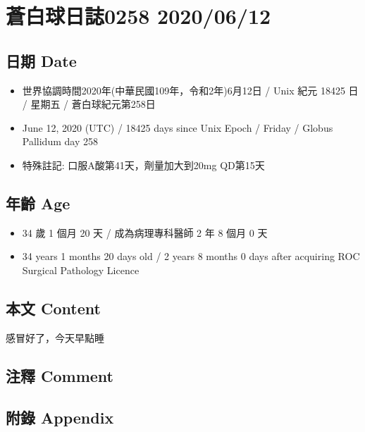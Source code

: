 \documentclass[a5paper, 11pt
]{book}
\providecommand{\tightlist}{%
  \setlength{\itemsep}{0pt}\setlength{\parskip}{0pt}}
\begin{document}
\hypertarget{ux84bcux767dux7403ux65e5ux8a8c0258-20200612}{%
\section{蒼白球日誌0258
2020/06/12}\label{ux84bcux767dux7403ux65e5ux8a8c0258-20200612}}

\hypertarget{ux65e5ux671f-date-11}{%
\subsection{日期 Date}\label{ux65e5ux671f-date-11}}

\begin{itemize}
\tightlist
\item
  世界協調時間2020年(中華民國109年，令和2年)6月12日 / Unix 紀元 18425 日
  / 星期五 / 蒼白球紀元第258日
\item
  June 12, 2020 (UTC) / 18425 days since Unix Epoch / Friday / Globus
  Pallidum day 258
\item
  特殊註記: 口服A酸第41天，劑量加大到20mg QD第15天
\end{itemize}

\hypertarget{ux5e74ux9f61-age-11}{%
\subsection{年齡 Age}\label{ux5e74ux9f61-age-11}}

\begin{itemize}
\tightlist
\item
  34 歲 1 個月 20 天 / 成為病理專科醫師 2 年 8 個月 0 天
\item
  34 years 1 months 20 days old / 2 years 8 months 0 days after
  acquiring ROC Surgical Pathology Licence
\end{itemize}

\hypertarget{ux672cux6587-content-11}{%
\subsection{本文 Content}\label{ux672cux6587-content-11}}

感冒好了，今天早點睡

\hypertarget{ux6ce8ux91cb-comment-11}{%
\subsection{注釋 Comment}\label{ux6ce8ux91cb-comment-11}}

\hypertarget{ux9644ux9304-appendix-11}{%
\subsection{附錄 Appendix}\label{ux9644ux9304-appendix-11}}
\end{document}

